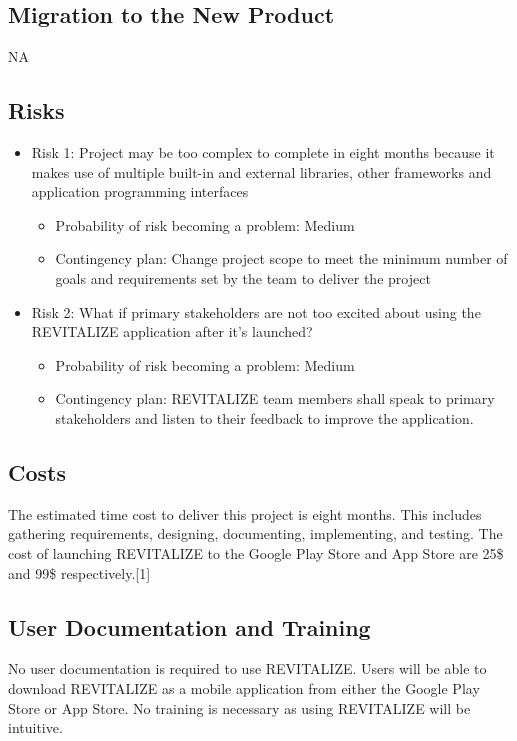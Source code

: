 \documentclass[12pt,letterpaper]{article}
\begin{document}
\subsection{Migration to the New Product}
NA

\subsection{Risks}
\begin{itemize}
\item Risk 1: Project may be too complex to complete in eight months because it makes use of multiple built-in and external libraries, other frameworks and application programming interfaces
\begin{itemize}
	\item Probability of risk becoming a problem: Medium
	\item Contingency plan: Change project scope to meet the minimum number of goals and requirements set by the team to deliver the project
\end{itemize}
\item Risk 2: What if primary stakeholders are not too excited about using the REVITALIZE application after it's launched?
\begin{itemize}
	\item Probability of risk becoming a problem: Medium
	\item Contingency plan: REVITALIZE team members shall speak to primary stakeholders and listen to their feedback to improve the application.
\end{itemize}
\end{itemize}

\subsection{Costs}
The estimated time cost to deliver this project is eight months. This includes gathering requirements, designing, documenting, implementing, and testing. The cost of launching REVITALIZE to the Google Play Store and App Store are 25\$ and 99\$ respectively.[1]

\subsection{User Documentation and Training}
No user documentation is required to use REVITALIZE. Users will be able to download REVITALIZE as a mobile application from either the Google Play Store or App Store. No training is necessary as using REVITALIZE will be intuitive.
\end{document}
